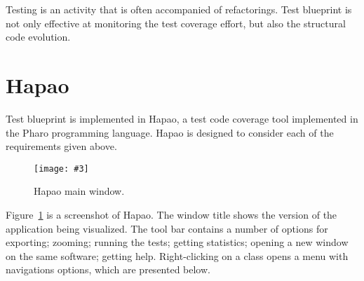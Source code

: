 \documentclass{sig-alternate}
\newcommand{\fig}[4]{
	\begin{figure}[#1]
		\centering
		\texttt{[image: \#3]}
		\caption{\label{fig:#3}#4}
	\end{figure}}
\newcommand{\seclabel}[1]{\label{sec:#1}}
\newcommand{\figref}[1]{Figure~\ref{fig:#1}}
\newcommand{\hapao}{Hapao\xspace}
\begin{document}
Testing is an activity that is often accompanied of refactorings. Test blueprint is not only effective at monitoring the test coverage effort, but also the structural code evolution.

\section{Hapao}

Test blueprint is implemented in Hapao, a test code coverage tool implemented in the Pharo programming language. \hapao is designed to consider each of the requirements given above. 

\fig{}{0.37}{Hapao.png}{Hapao main window.}

\figref{Hapao.png} is a screenshot of Hapao. The window title shows the version of the application being visualized. The tool bar contains a number of options for exporting; zooming; running the tests; getting statistics; opening a new window on the same software; getting help. Right-clicking on a class opens a menu with navigations options, which are presented below. 



%




%
\end{document}
